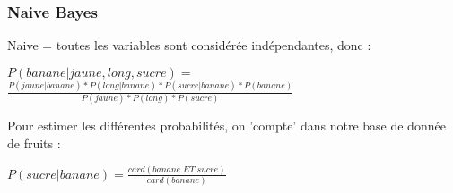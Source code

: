 \begin{frame}
  \frametitle{Naive Bayes}
  Naive = toutes les variables sont considérée indépendantes, donc : \\
  \begin{center}
    $P(banane | jaune,long,sucre) =$\\
    $\;$\\
    $ \frac{P(jaune|banane)*P(long|banane)*P(sucre|banane)*P(banane)}{P(jaune)*P(long)*P(sucre)}$
  \end{center}
  Pour estimer les différentes probabilités, on 'compte' dans notre base de donnée de fruits :\\
  \begin{center}
    $P(sucre|banane) = \frac{card(banane\;ET\;sucre)}{card(banane)}$
  \end{center}
\end{frame}
